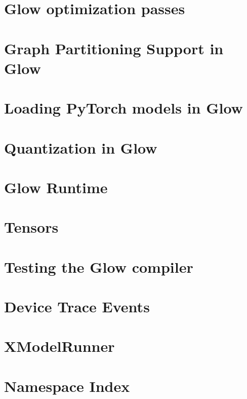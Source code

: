 \documentclass[twoside]{book}
\newcommand{\+}{\discretionary{\mbox{\scriptsize$\hookleftarrow$}}{}{}}
\begin{document}
\chapter{Glow optimization passes}
\label{md_docs__optimizations}

\chapter{Graph Partitioning Support in Glow}
\label{md_docs__partitioner}

\chapter{Loading Py\+Torch models in Glow}
\label{md_docs_pytorch}

\chapter{Quantization in Glow}
\label{md_docs__quantization}

\chapter{Glow Runtime}
\label{md_docs__runtime}

\chapter{Tensors}
\label{md_docs__tensors}

\chapter{Testing the Glow compiler}
\label{md_docs__testing}

\chapter{Device Trace Events}
\label{md_docs__tracing}

\chapter{X\+Model\+Runner}
\label{md_docs__x_model_runner}

\chapter{Namespace Index}

\end{document}
